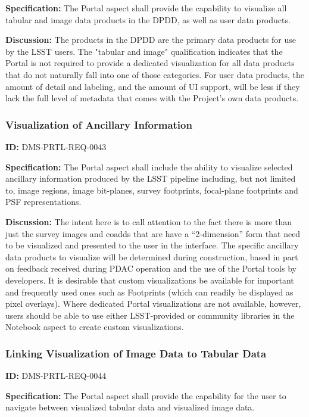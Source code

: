 \documentclass[SE,toc,lsstdraft]{lsstdoc}
\begin{document}
\textbf{Specification:}
The Portal aspect shall provide the capability to visualize all tabular and image data products in the DPDD, as well as user data products.

\textbf{Discussion:}
The products in the DPDD are the primary data products for use by the LSST users.  The "tabular and image" qualification indicates that the Portal is not required to provide a dedicated visualization for all data products that do not naturally fall into one of those categories.
For user data products, the amount of detail and labeling, and the amount of UI support, will be less if they lack the full level of metadata that comes with the Project's own data products.

\subsubsection{Visualization of Ancillary Information}

\label{DMS-PRTL-REQ-0043}
\textbf{ID:} DMS-PRTL-REQ-0043

\textbf{Specification:}
The Portal aspect shall include the ability to visualize selected ancillary information produced by the LSST pipeline including, but not limited to, image regions, image bit-planes, survey footprints, focal-plane footprints and PSF representations.

\textbf{Discussion:}
The intent here is to call attention to the fact there is more than just the survey images and coadds that are have a “2-dimension” form that need to be visualized and presented to the user in the interface.
The specific ancillary data products to visualize will be determined during construction, based in part on feedback received during PDAC operation and the use of the Portal tools by developers.
It is desirable that custom visualizations be available for important and frequently used ones such as Footprints (which can readily be displayed as pixel overlays).  Where dedicated Portal visualizations are not available, however, users should be able to use either LSST-provided or community libraries in the Notebook aspect to create custom visualizations.

\subsubsection{Linking Visualization of Image Data to Tabular Data}

\label{DMS-PRTL-REQ-0044}
\textbf{ID:} DMS-PRTL-REQ-0044

\textbf{Specification:}
The Portal aspect shall provide the capability for the user to navigate between visualized tabular data and visualized image data.
\end{document}
